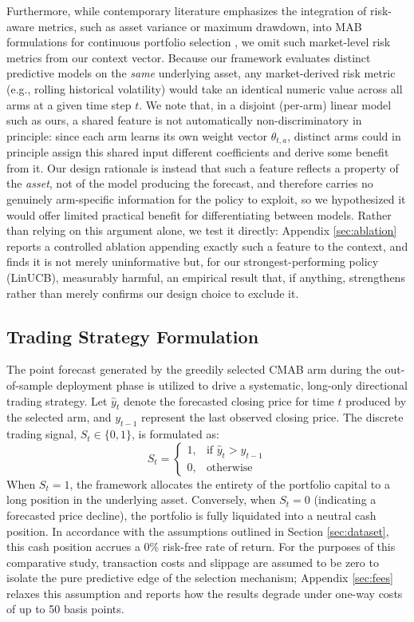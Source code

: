 \documentclass[pdflatex,sn-mathphys-num]{sn-jnl}
\theoremstyle{thmstyleone}%
\theoremstyle{thmstyletwo}%
\theoremstyle{thmstylethree}%
\begin{document}
Furthermore, while contemporary literature emphasizes the integration of risk-aware metrics, such as asset variance or maximum drawdown, into MAB formulations for continuous portfolio selection \cite{huo2017risk}, we omit such market-level risk metrics from our context vector. Because our framework evaluates distinct predictive models on the \emph{same} underlying asset, any market-derived risk metric (e.g., rolling historical volatility) would take an identical numeric value across all arms at a given time step $t$. We note that, in a disjoint (per-arm) linear model such as ours, a shared feature is not automatically non-discriminatory in principle: since each arm learns its own weight vector $\theta_{t,a}$, distinct arms could in principle assign this shared input different coefficients and derive some benefit from it. Our design rationale is instead that such a feature reflects a property of the \emph{asset}, not of the model producing the forecast, and therefore carries no genuinely arm-specific information for the policy to exploit, so we hypothesized it would offer limited practical benefit for differentiating between models. Rather than relying on this argument alone, we test it directly: Appendix \ref{sec:ablation} reports a controlled ablation appending exactly such a feature to the context, and finds it is not merely uninformative but, for our strongest-performing policy (LinUCB), measurably harmful, an empirical result that, if anything, strengthens rather than merely confirms our design choice to exclude it.

\subsection{Trading Strategy Formulation}
\label{sec:pred}

The point forecast generated by the greedily selected CMAB arm during the out-of-sample deployment phase is utilized to drive a systematic, long-only directional trading strategy. Let $\hat{y}_t$ denote the forecasted closing price for time $t$ produced by the selected arm, and $y_{t-1}$ represent the last observed closing price. The discrete trading signal, $S_t \in \{0, 1\}$, is formulated as:
\begin{equation}
    S_t = 
    \begin{cases} 
      1, & \text{if } \hat{y}_t > y_{t-1} \\
      0, & \text{otherwise}
    \end{cases}
\end{equation}
When $S_t = 1$, the framework allocates the entirety of the portfolio capital to a long position in the underlying asset. Conversely, when $S_t = 0$ (indicating a forecasted price decline), the portfolio is fully liquidated into a neutral cash position. In accordance with the assumptions outlined in Section \ref{sec:dataset}, this cash position accrues a 0\% risk-free rate of return. For the purposes of this comparative study, transaction costs and slippage are assumed to be zero to isolate the pure predictive edge of the selection mechanism; Appendix \ref{sec:fees} relaxes this assumption and reports how the results degrade under one-way costs of up to 50 basis points.
\end{document}
